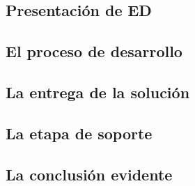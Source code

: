 \subsection{Presentación de ED}
  
\subsection{El proceso de desarrollo}
  
\subsection{La entrega de la solución}
  
\subsection{La etapa de soporte}
  
\subsection{La conclusión evidente}
  
